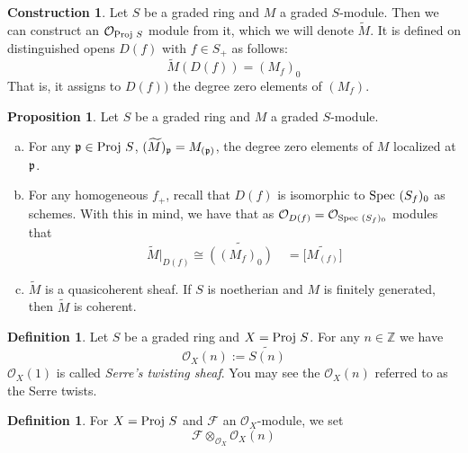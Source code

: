 \documentclass[10pt,reqno]{amsart}
\theoremstyle{definition}
\newtheorem{definition}[theorem]{Definition}
\newtheorem{proposition}[theorem]{Proposition}
\newtheorem{construction}[theorem]{Construction}
\theoremstyle{remark}
\numberwithin{equation}{section}
\numberwithin{theorem}{section}
\newcommand{\Z}{{\mathbb Z}}
\newcommand{\OO}{{\mathcal O}}
\newcommand{\spec}{\textup{Spec }}
\newcommand{\proj}{\textup{Proj }}
\newcommand{\FF}{{\mathscr F}}
\newcommand{\pp}{\frak{p}}
\newcommand{\wt}{\widetilde}
\begin{document}
\begin{construction} Let $S$ be a graded ring and $M$ a graded $S$-module. Then we can construct an $\OO_{\proj S}$ module from it, which we will denote $\wt{M}$. It is defined on distinguished opens $D(f)$ with $f \in S_+$ as follows:
\[\wt{M}(D(f)) = (M_f)_0 \]
That is, it assigns to $D(f))$ the degree zero elements of $(M_f)$. 
\end{construction}

\begin{proposition} Let $S$ be a graded ring and $M$ a graded $S$-module.
\begin{enumerate}[(a)]
\item For any $\pp \in \proj S$, $(\wt{M})_{\pp} = M_{(\pp)}$, the degree zero elements of $M$ localized at $\pp$.
\item For any homogeneous $f_+$, recall that $D(f)$ is isomorphic to $\spec (S_f)_0$ as schemes. With this in mind, we have that as $\OO_{D(f)} = \OO_{\spec (S_f)_0}$ modules that
\[\wt{M}|_{D(f)} \cong \wt{((M_{f})_0)} \quad = \big[ \wt{M_{(f)}} \big]\]
\item $\wt{M}$ is a quasicoherent sheaf. If $S$ is noetherian and $M$ is finitely generated, then $\wt{M}$ is coherent.
\end{enumerate}
\end{proposition}

\begin{definition} Let $S$ be a graded ring and $X = \proj S$. For any $n \in \Z$ we have 
\[\OO_X(n) := \wt{S(n)}\]
$\OO_X(1)$ is called \textit{Serre's twisting sheaf}. You may see the $\OO_X(n)$ referred to as the Serre twists.
\end{definition}

\begin{definition} For $X = \proj S$ and $\FF$ an $\OO_X$-module, we set
\[\FF \otimes_{\OO_X} \OO_X(n)\]
\end{definition}
\end{document}
